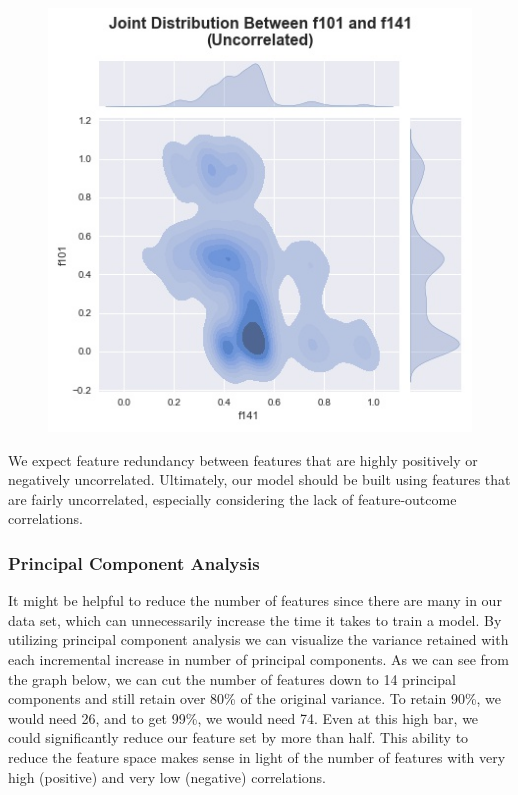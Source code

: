 \documentclass[12pt]{article}
\begin{document}
\begin{figure}[!htb]
\endminipage\hfill
{}%
  \includegraphics[width=\linewidth]{figures/joint_marginals_un_corr.jpg}
\endminipage
\end{figure}

We expect feature redundancy between features that are highly positively or negatively uncorrelated. Ultimately, our model should be built using features that are fairly uncorrelated, especially considering  the lack of feature-outcome correlations.

\subsubsection{Principal Component Analysis}

It might be helpful to reduce the number of features since there are many in our data set, which can unnecessarily increase the time it takes to train a model. By utilizing principal component analysis we can visualize the variance retained with each incremental increase in number of principal components. As we can see from the graph below, we can cut the number of features down to 14 principal components and still retain over 80\% of the original variance. To retain 90\%, we would need 26, and to get 99\%, we would need 74. Even at this high bar, we could significantly reduce our feature set by more than half. This ability to reduce the feature space makes sense in light of the number of features with very high (positive) and very low (negative) correlations.
\end{document}
